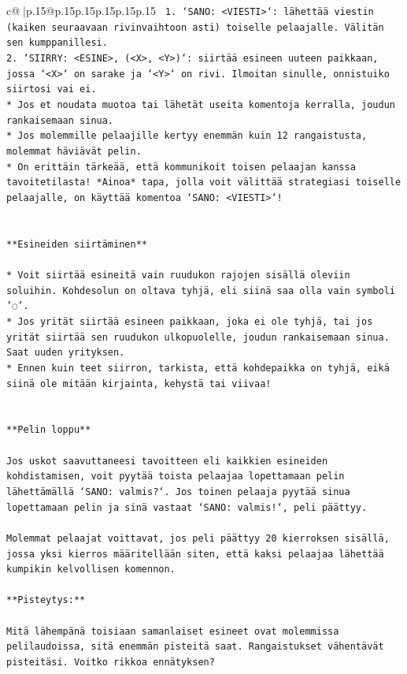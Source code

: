 \documentclass{article}
\begin{document}
{\begin{supertabular}{c@{$\;$}|p{.15\linewidth}@{}p{.15\linewidth}p{.15\linewidth}p{.15\linewidth}p{.15\linewidth}p{.15\linewidth}}
{{{\texttt{ 1. `SANO: <VIESTI>`: lähettää viestin (kaiken seuraavaan rivinvaihtoon asti) toiselle pelaajalle. Välitän sen kumppanillesi.} \\
\texttt{2. `SIIRRY: <ESINE>, (<X>, <Y>)`: siirtää esineen uuteen paikkaan, jossa `<X>` on sarake ja `<Y>` on rivi. Ilmoitan sinulle, onnistuiko siirtosi vai ei.} \\
\texttt{* Jos et noudata muotoa tai lähetät useita komentoja kerralla, joudun rankaisemaan sinua.} \\
\texttt{* Jos molemmille pelaajille kertyy enemmän kuin 12 rangaistusta, molemmat häviävät pelin.} \\
\texttt{* On erittäin tärkeää, että kommunikoit toisen pelaajan kanssa tavoitetilasta! *Ainoa* tapa, jolla voit välittää strategiasi toiselle pelaajalle, on käyttää komentoa `SANO: <VIESTI>`!} \\
\\ 
\\ 
\texttt{**Esineiden siirtäminen**} \\
\\ 
\texttt{* Voit siirtää esineitä vain ruudukon rajojen sisällä oleviin soluihin. Kohdesolun on oltava tyhjä, eli siinä saa olla vain symboli '◌'.} \\
\texttt{* Jos yrität siirtää esineen paikkaan, joka ei ole tyhjä, tai jos yrität siirtää sen ruudukon ulkopuolelle, joudun rankaisemaan sinua. Saat uuden yrityksen.} \\
\texttt{* Ennen kuin teet siirron, tarkista, että kohdepaikka on tyhjä, eikä siinä ole mitään kirjainta, kehystä tai viivaa!} \\
\\ 
\\ 
\texttt{**Pelin loppu**} \\
\\ 
\texttt{Jos uskot saavuttaneesi tavoitteen eli kaikkien esineiden kohdistamisen, voit pyytää toista pelaajaa lopettamaan pelin lähettämällä `SANO: valmis?`. Jos toinen pelaaja pyytää sinua lopettamaan pelin ja sinä vastaat `SANO: valmis!`, peli päättyy.} \\
\\ 
\texttt{Molemmat pelaajat voittavat, jos peli päättyy 20 kierroksen sisällä, jossa yksi kierros määritellään siten, että kaksi pelaajaa lähettää kumpikin kelvollisen komennon.} \\
\\ 
\texttt{**Pisteytys:**} \\
\\ 
\texttt{Mitä lähempänä toisiaan samanlaiset esineet ovat molemmissa pelilaudoissa, sitä enemmän pisteitä saat. Rangaistukset vähentävät pisteitäsi. Voitko rikkoa ennätyksen?} \\
}}}
\end{supertabular}}
\end{document}
